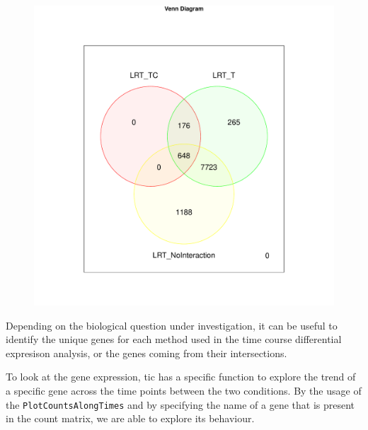 \begin{figure}[H]
\includegraphics[width=\textwidth,height=\textheight,keepaspectratio]{img/ticorser/de/venn3.pdf}
\caption[ticorser venn diagram]{}
\label{fig:ticorservenn}
\centering
\end{figure}

Depending on the biological question under investigation, it can be useful to identify the unique genes for each method used in the time course differential expresison analysis, or the genes coming from their intersections.

To look at the gene expression, \gls{tic} has a specific function to explore the trend of a specific gene across the time points between the two conditions. 
By the usage of the \lstinline!PlotCountsAlongTimes! and by specifying the name of a gene that is present in the count matrix, we are able to explore its behaviour.


